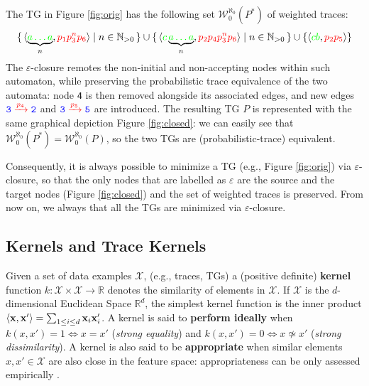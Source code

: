 \begin{example}
The TG in Figure \ref{fig:orig} has the following set $\mathcal{W}_0^{\aleph_0}(P^*)$ of weighted traces:
$$\set{\braket{\underbrace{\color{green}a\dots a}_{n},{\color{red}p_1p_3^np_6}}|n\in \mathbb{N}_{>0}}\cup \set{\braket{{\color{green}c}\underbrace{\color{green}a\dots a}_{n},{\color{red}p_2p_4p_3^np_6}}|n\in \mathbb{N}_{>0}}\cup\{\braket{{\color{green}cb},{\color{red}p_2p_5}}\}$$
The $\varepsilon$-closure remotes the non-initial and non-accepting nodes within such automaton, while preserving the probabilistic trace equivalence of the two automata: node \texttt{\color{blue}4} is then removed alongside its associated edges, and new edges $\texttt{\color{blue}3}\xrightarrow{\color{red}p_4}\texttt{\color{blue}2}$ and $\texttt{\color{blue}3}\xrightarrow{\color{red}p_5}\texttt{\color{blue}5}$ are introduced. The resulting TG $P$ is represented with the same graphical depiction Figure \ref{fig:closed}: 
we can easily see that $\mathcal{W}_0^{\aleph_0}(P^*)=\mathcal{W}_0^{\aleph_0}(P)$, so the two TGs are (probabilistic-trace) equivalent.
\end{example}

Consequently, it is always possible to minimize a TG  (e.g., Figure \ref{fig:orig}) via $\varepsilon$-closure, so that the only nodes that are labelled as $\varepsilon$ are the source and the target nodes (Figure \ref{fig:closed}) and the set of weighted traces is preserved. From now on, we always that all the TGs are minimized via $\varepsilon$-closure.


\subsection{Kernels and Trace Kernels}\label{subsec:katk}
Given a set of data examples $\mathcal{X}$, (e.g., traces, TGs) a (positive definite) \textbf{kernel} function $k\colon \mathcal{X}\times \mathcal{X}\to \mathbb{R}$ denotes the similarity of elements in $\mathcal{X}$. If $\mathcal{X}$ is the $d$-dimensional Euclidean Space $\mathbb{R}^d$, the simplest kernel function is the inner product $\Braket{\mathbf{x},\mathbf{x}'}=\sum_{1\leq i\leq d}\mathbf{x}_i\mathbf{x}'_i$. 
A kernel is said to \textbf{perform ideally} \cite{Gartner03} when $k(x,x')=1\Leftrightarrow x=x'$ (\textit{strong equality}) and $k(x,x')=0\Leftrightarrow x\not\simeq x'$ (\textit{strong dissimilarity}). A kernel is also said to be \textbf{appropriate} when similar elements $x,x'\in\mathcal{X}$ are also close in the feature space: appropriateness can be only assessed  empirically \cite{Gartner03}.

